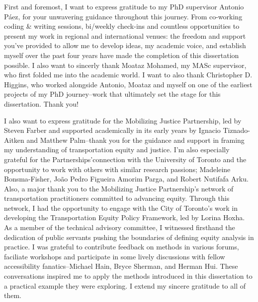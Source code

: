 \documentclass[
11pt, %
oneside, %
english, %
singlespacing, %
]{macthesis} %
\begin{document}
  \begin{acknowledgements}
  \addchaptertocentry{\acknowledgementname} %
    First and foremost, I want to express gratitude to my PhD supervisor Antonio Páez, for your unwavering guidance throughout this journey. From co-working coding \& writing sessions, bi/weekly check-ins and countless opportunities to present my work in regional and international venues: the freedom and support you've provided to allow me to develop ideas, my academic voice, and establish myself over the past four years have made the completion of this dissertation possible. I also want to sincerly thank Moataz Mohamed, my MASc supervisor, who first folded me into the academic world. I want to also thank Christopher D. Higgins, who worked alongside Antonio, Moataz and myself on one of the earliest projects of my PhD journey--work that ultimately set the stage for this dissertation. Thank you!

    I also want to express gratitude for the Mobilizing Justice Partnership, led by Steven Farber and supported academically in its early years by Ignacio Tiznado-Aitken and Matthew Palm--thank you for the guidance and support in framing my understanding of transportation equity and justice. I'm also especially grateful for the Partnerships'connection with the University of Toronto and the opportunity to work with others with similar research passions; Madeleine Bonsma-Fisher, João Pedro Figueira Amorim Parga, and Robert Nutifafa Arku. Also, a major thank you to the Mobilizing Justice Partnership's network of transportation practitioners committed to advancing equity. Through this network, I had the opportunity to engage with the City of Toronto's work in developing the Transportation Equity Policy Framework, led by Lorina Hoxha. As a member of the technical advisory committee, I witnessed firsthand the dedication of public servants pushing the boundaries of defining equity analysis in practice. I was grateful to contribute feedback on methods in various forums, faciliate workshops and participate in some lively discussions with fellow accessibility fanatics--Michael Hain, Bryce Sherman, and Herman Hui. These conversations inspired me to apply the methods introduced in this dissertation to a practical example they were exploring. I extend my sincere gratitude to all of them.


\end{acknowledgements}
\end{document}
